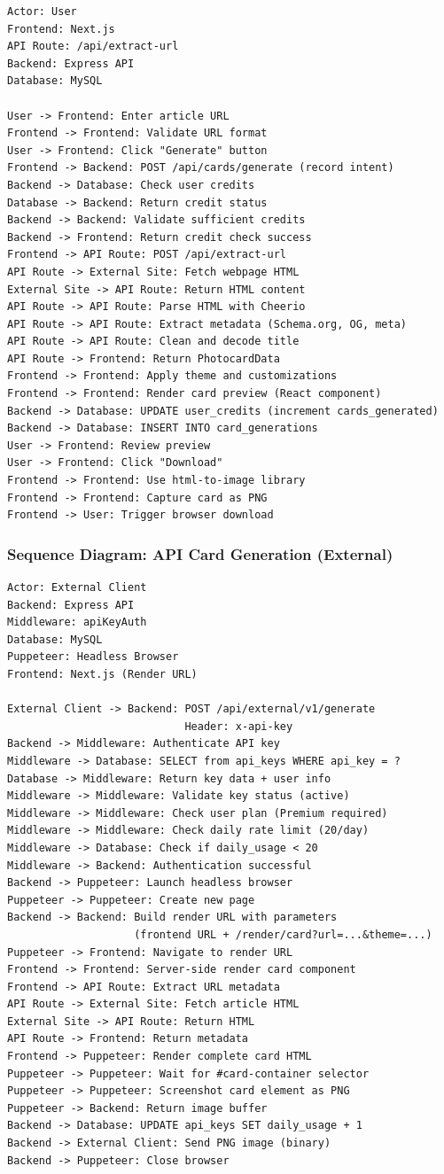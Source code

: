 \documentclass[12pt,a4paper]{article}
\begin{document}
\begin{verbatim}
Actor: User
Frontend: Next.js
API Route: /api/extract-url
Backend: Express API
Database: MySQL

User -> Frontend: Enter article URL
Frontend -> Frontend: Validate URL format
User -> Frontend: Click "Generate" button
Frontend -> Backend: POST /api/cards/generate (record intent)
Backend -> Database: Check user credits
Database -> Backend: Return credit status
Backend -> Backend: Validate sufficient credits
Backend -> Frontend: Return credit check success
Frontend -> API Route: POST /api/extract-url
API Route -> External Site: Fetch webpage HTML
External Site -> API Route: Return HTML content
API Route -> API Route: Parse HTML with Cheerio
API Route -> API Route: Extract metadata (Schema.org, OG, meta)
API Route -> API Route: Clean and decode title
API Route -> Frontend: Return PhotocardData
Frontend -> Frontend: Apply theme and customizations
Frontend -> Frontend: Render card preview (React component)
Backend -> Database: UPDATE user_credits (increment cards_generated)
Backend -> Database: INSERT INTO card_generations
User -> Frontend: Review preview
User -> Frontend: Click "Download"
Frontend -> Frontend: Use html-to-image library
Frontend -> Frontend: Capture card as PNG
Frontend -> User: Trigger browser download
\end{verbatim}

\subsubsection{Sequence Diagram: API Card Generation (External)}

\begin{verbatim}
Actor: External Client
Backend: Express API
Middleware: apiKeyAuth
Database: MySQL
Puppeteer: Headless Browser
Frontend: Next.js (Render URL)

External Client -> Backend: POST /api/external/v1/generate
                            Header: x-api-key
Backend -> Middleware: Authenticate API key
Middleware -> Database: SELECT from api_keys WHERE api_key = ?
Database -> Middleware: Return key data + user info
Middleware -> Middleware: Validate key status (active)
Middleware -> Middleware: Check user plan (Premium required)
Middleware -> Middleware: Check daily rate limit (20/day)
Middleware -> Database: Check if daily_usage < 20
Middleware -> Backend: Authentication successful
Backend -> Puppeteer: Launch headless browser
Puppeteer -> Puppeteer: Create new page
Backend -> Backend: Build render URL with parameters
                    (frontend URL + /render/card?url=...&theme=...)
Puppeteer -> Frontend: Navigate to render URL
Frontend -> Frontend: Server-side render card component
Frontend -> API Route: Extract URL metadata
API Route -> External Site: Fetch article HTML
External Site -> API Route: Return HTML
API Route -> Frontend: Return metadata
Frontend -> Puppeteer: Render complete card HTML
Puppeteer -> Puppeteer: Wait for #card-container selector
Puppeteer -> Puppeteer: Screenshot card element as PNG
Puppeteer -> Backend: Return image buffer
Backend -> Database: UPDATE api_keys SET daily_usage + 1
Backend -> External Client: Send PNG image (binary)
Backend -> Puppeteer: Close browser
\end{verbatim}
\end{document}
